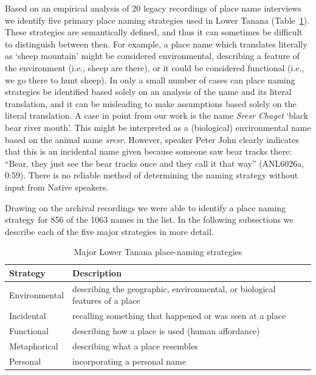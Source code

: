 Based on an empirical analysis of 20 legacy recordings of place name interviews we identify five primary place naming strategies used in Lower Tanana (Table~\ref{holton:tab:strategies}). These strategies are semantically defined, and thus it can sometimes be difficult to distinguish between then. For example, a place name which translates literally as `sheep mountain' might be considered environmental, describing a feature of the environment (i.e., sheep are there), or it could be considered functional (i.e., we go there to hunt sheep). In only a small number of cases can place naming strategies be identified based solely on an analysis of the name and its literal translation, and it can be misleading to make assumptions based solely on the literal translation. A case in point from our work is the name \textit{Sresr Chaget}  ‘black bear river mouth’. This might be interpreted as a (biological) environmental name based on the animal name \textit{sresr}. However, speaker Peter John clearly indicates that this is an incidental name given because someone saw bear tracks there: “Bear, they just see the bear tracks once and they call it that way” (ANL6026a, 0:59). There is no reliable method of determining the naming strategy without input from Native speakers. 

Drawing on  the archival recordings we were able to identify a place naming strategy for 856 of the 1063 names in the list. In the following subsections we describe each of the five major strategies in more detail.

\begin{table}[h]
\centering
\caption{Major Lower Tanana place-naming strategies}\label{holton:tab:strategies}
\begin{tabular}{l | l}
\textbf{Strategy} & \textbf{Description}\\\hline
Environmental & describing the geographic, environmental, or biological features of a place\\
Incidental & recalling something that happened or was seen at a place\\
Functional & describing how a place is used (human affordance)\\
Metaphorical & describing what a place resembles\\
Personal & incorporating a personal name\\
\end{tabular}\end{table}



